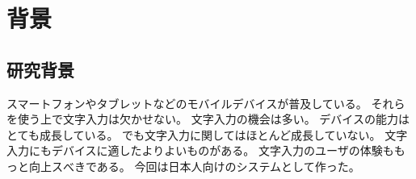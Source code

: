 \chapter{背景}
\label{chap:background}

\section{研究背景}

スマートフォンやタブレットなどのモバイルデバイスが普及している。
それらを使う上で文字入力は欠かせない。
文字入力の機会は多い。
デバイスの能力はとても成長している。
でも文字入力に関してはほとんど成長していない。
文字入力にもデバイスに適したよりよいものがある。
文字入力のユーザの体験ももっと向上スべきである。
今回は日本人向けのシステムとして作った。

